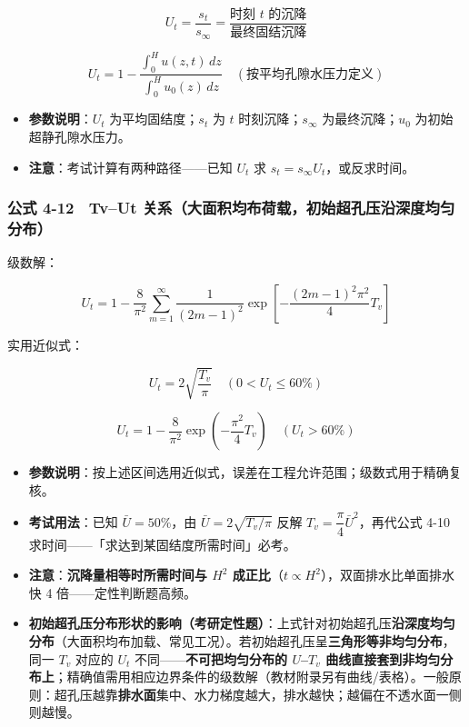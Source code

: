 \documentclass[
]{article}
\providecommand{\tightlist}{%
  \setlength{\itemsep}{0pt}\setlength{\parskip}{0pt}}
\begin{document}
\[U_t=\frac{s_t}{s_\infty}=\frac{\text{时刻 }t\text{ 的沉降}}{\text{最终固结沉降}}\]

\[U_t=1-\frac{\int_0^H u(z,t)\,dz}{\int_0^H u_0(z)\,dz}\quad(\text{按平均孔隙水压力定义})\]

\begin{itemize}
\tightlist
\item
  \textbf{参数说明}：\(U_t\) 为平均固结度；\(s_t\) 为 \(t\)
  时刻沉降；\(s_\infty\) 为最终沉降；\(u_0\) 为初始超静孔隙水压力。
\item
  \textbf{注意}：考试计算有两种路径------已知 \(U_t\) 求
  \(s_t=s_\infty U_t\)，或反求时间。
\end{itemize}

\subsubsection{公式 4-12　Tv--Ut
关系（大面积均布荷载，初始超孔压沿深度均匀分布）}\label{ux516cux5f0f-4-12-tvut-ux5173ux7cfbux5927ux9762ux79efux5747ux5e03ux8377ux8f7dux521dux59cbux8d85ux5b54ux538bux6cbfux6df1ux5ea6ux5747ux5300ux5206ux5e03}

级数解：

\[U_t=1-\frac{8}{\pi^2}\sum_{m=1}^{\infty}\frac{1}{(2m-1)^2}\exp\left[-\frac{(2m-1)^2\pi^2}{4}T_v\right]\]

实用近似式：

\[U_t=2\sqrt{\frac{T_v}{\pi}}\quad(0<U_t\le60\%)\]

\[U_t=1-\frac{8}{\pi^2}\exp\left(-\frac{\pi^2}{4}T_v\right)\quad(U_t>60\%)\]

\begin{itemize}
\tightlist
\item
  \textbf{参数说明}：按上述区间选用近似式，误差在工程允许范围；级数式用于精确复核。
\item
  \textbf{考试用法}：已知 \(\bar{U}=50\%\)，由
  \(\bar{U}=2\sqrt{T_v/\pi}\) 反解
  \(T_v=\dfrac{\pi}{4}\bar{U}^2\)，再代公式 4-10
  求时间------「求达到某固结度所需时间」必考。
\item
  \textbf{注意}：\textbf{沉降量相等时所需时间与 \(H^2\)
  成正比}（\(t\propto H^2\)），双面排水比单面排水快 4
  倍------定性判断题高频。
\item
  \textbf{初始超孔压分布形状的影响（考研定性题）}：上式针对初始超孔压\textbf{沿深度均匀分布}（大面积均布加载、常见工况）。若初始超孔压呈\textbf{三角形等非均匀分布}，同一
  \(T_v\) 对应的 \(U_t\) 不同------\textbf{不可把均匀分布的
  \(U\)--\(T_v\)
  曲线直接套到非均匀分布上}；精确值需用相应边界条件的级数解（教材附录另有曲线/表格）。一般原则：超孔压越靠\textbf{排水面}集中、水力梯度越大，排水越快；越偏在不透水面一侧则越慢。
\end{itemize}
\end{document}
